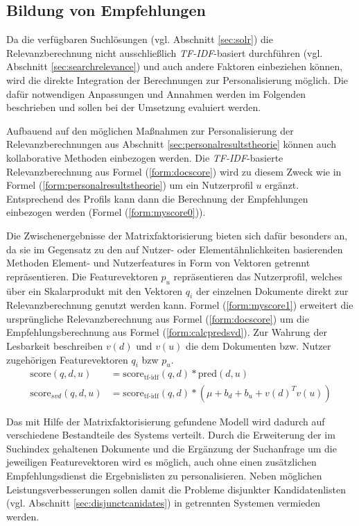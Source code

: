 \subsection{Bildung von Empfehlungen}\label{sec:myrecommend}

Da die verfügbaren Suchlösungen (vgl. Abschnitt \ref{sec:solr}) die Relevanzberechnung nicht ausschließlich \textit{TF-IDF}-basiert durchführen (vgl. Abschnitt \ref{sec:searchrelevance}) und auch andere Faktoren einbeziehen können, wird die direkte Integration der Berechnungen zur Personalisierung möglich. Die dafür notwendigen Anpassungen und Annahmen werden im Folgenden beschrieben und sollen bei der Umsetzung evaluiert werden.

Aufbauend auf den möglichen Maßnahmen zur Personalisierung der Relevanzberechnungen aus Abschnitt  \ref{sec:personalresultstheorie} können auch kollaborative Methoden einbezogen werden. Die \textit{TF-IDF}-basierte Relevanzberechnung aus Formel (\ref{form:docscore}) wird zu diesem Zweck wie in Formel (\ref{form:personalresultstheorie}) um  ein Nutzerprofil $u$ ergänzt. Entsprechend des Profils kann dann die Berechnung der Empfehlungen einbezogen werden (Formel (\ref{form:myscore0})).

Die Zwischenergebnisse der Matrixfaktorisierung bieten sich dafür besonders an, da sie im Gegensatz zu den auf Nutzer- oder Elementähnlichkeiten basierenden Methoden Element- und Nutzerfeatures in Form von Vektoren getrennt repräsentieren. Die Featurevektoren $p_u$ repräsentieren das Nutzerprofil, welches über ein Skalarprodukt  mit den Vektoren $q_i$ der einzelnen Dokumente direkt zur Relevanzberechnung genutzt werden kann. Formel (\ref{form:myscore1}) erweitert die ursprüngliche Relevanzberechnung aus Formel (\ref{form:docscore}) um die Empfehlungsberechnung aus Formel (\ref{form:calcpredsvd}). Zur Wahrung der Lesbarkeit beschreiben $v(d)$ und $v(u)$ die dem Dokumenten bzw. Nutzer zugehörigen Featurevektoren $q_i$ bzw $p_u$.
\begin{align}
\text{score}(q,d,u) & = \text{score}_{\text{tf-idf}}(q,d) * \text{pred}(d, u)\label{form:myscore0} \\
\text{score}_{svd}(q,d,u) & = \text{score}_{\text{tf-idf}}(q,d) * (\mu + b_d + b_u + v(d)^Tv(u)) \label{form:myscore1}
\end{align}

Das mit Hilfe der Matrixfaktorisierung gefundene Modell wird dadurch auf verschiedene Bestandteile des Systems verteilt. Durch die Erweiterung der im Suchindex gehaltenen Dokumente und die Ergänzung der Suchanfrage um die jeweiligen Featurevektoren wird es möglich, auch ohne einen zusätzlichen Empfehlungsdienst die Ergebnislisten zu personalisieren. Neben möglichen Leistungsverbesserungen sollen damit die Probleme disjunkter Kandidatenlisten (vgl. Abschnitt \ref{sec:disjunctcanidates}) in getrennten Systemen vermieden werden.


